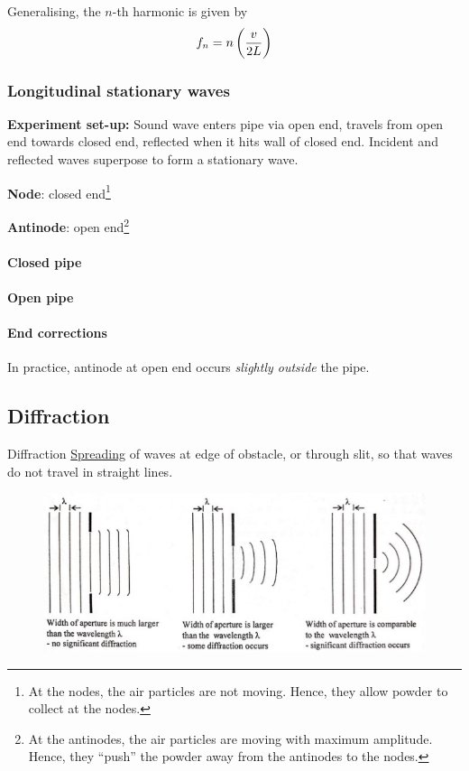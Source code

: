 Generalising, the $n$-th harmonic is given by 
\[ f_n = n\left(\frac{v}{2L}\right) \]

\subsubsection{Longitudinal stationary waves}

\textbf{Experiment set-up:} Sound wave enters pipe via open end, travels from open end towards closed end, reflected when it hits wall of closed end.  Incident and reflected waves superpose to form a stationary wave.

\textbf{Node}: closed end\footnote{At the nodes, the air particles are not moving. Hence, they allow powder to collect at the nodes.}

\textbf{Antinode}: open end\footnote{At the antinodes, the air particles are moving with maximum amplitude. Hence, they ``push'' the powder away from the antinodes to the nodes.}

\paragraph{Closed pipe}

\paragraph{Open pipe}

\paragraph{End corrections} In practice, antinode at open end occurs \emph{slightly outside} the pipe.

\subsection{Diffraction}
\begin{defn}{Diffraction}{}
\underline{Spreading} of waves at edge of obstacle, or through slit, so that waves do not travel in straight lines.
\end{defn}

\begin{figure}[H]
    \centering
    \includegraphics[width=15cm]{images/diffraction_waves.jpg}
\end{figure}

